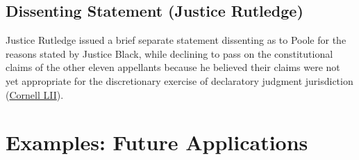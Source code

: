 \documentclass[12pt]{article}
\begin{document}
\subsection{Dissenting Statement (Justice Rutledge)}

Justice Rutledge issued a brief separate statement dissenting as to Poole for the reasons stated by Justice Black, while declining to pass on the constitutional claims of the other eleven appellants because he believed their claims were not yet appropriate for the discretionary exercise of declaratory judgment jurisdiction (\href{https://www.law.cornell.edu/supremecourt/text/330/75}{Cornell LII}).

\section{Examples: Future Applications}
\end{document}
